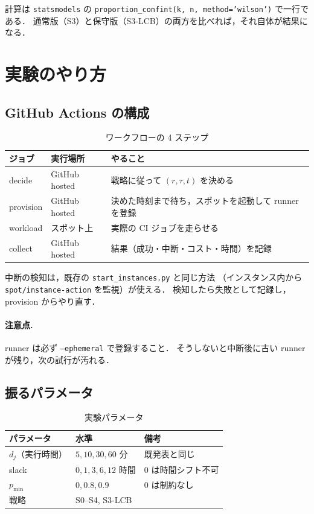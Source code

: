 \documentclass[11pt,a4paper]{ltjsarticle}
\begin{document}
計算は \texttt{statsmodels} の \texttt{proportion\_confint(k, n,
method='wilson')} で一行である．
通常版（S3）と保守版（S3-LCB）の両方を比べれば，それ自体が結果になる．

\section{実験のやり方}

\subsection{GitHub Actions の構成}

\begin{table}[htbp]
\centering
\caption{ワークフローの 4 ステップ}
\begin{tabularx}{\textwidth}{@{}llX@{}}
\toprule
ジョブ & 実行場所 & やること \\
\midrule
decide    & GitHub hosted & 戦略に従って $(r, \tau, t)$ を決める \\
\addlinespace
provision & GitHub hosted & 決めた時刻まで待ち，スポットを起動して
                            runner を登録 \\
\addlinespace
workload  & スポット上 & 実際の CI ジョブを走らせる \\
\addlinespace
collect   & GitHub hosted & 結果（成功・中断・コスト・時間）を記録 \\
\bottomrule
\end{tabularx}
\end{table}

中断の検知は，既存の \texttt{start\_instances.py} と同じ方法
（インスタンス内から \texttt{spot/instance-action} を監視）が使える．
検知したら失敗として記録し，provision からやり直す．

\paragraph{注意点.}
runner は必ず \texttt{--ephemeral} で登録すること．
そうしないと中断後に古い runner が残り，次の試行が汚れる．

\subsection{振るパラメータ}

\begin{table}[htbp]
\centering
\caption{実験パラメータ}
\begin{tabularx}{\textwidth}{@{}llX@{}}
\toprule
パラメータ & 水準 & 備考 \\
\midrule
$d_j$（実行時間） & $5, 10, 30, 60$ 分 & 既発表と同じ \\
slack             & $0, 1, 3, 6, 12$ 時間 & $0$ は時間シフト不可 \\
$p_{\min}$        & $0, 0.8, 0.9$ & $0$ は制約なし \\
戦略              & S0--S4, S3-LCB & \\
\bottomrule
\end{tabularx}
\end{table}
\end{document}
